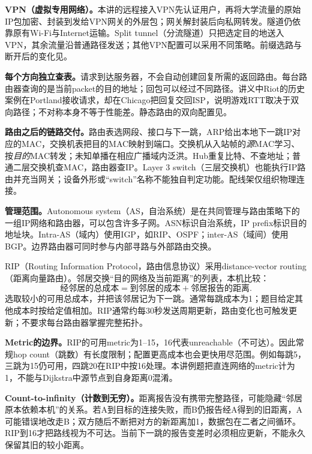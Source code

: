\textbf{VPN（虚拟专用网络）。}本讲的远程接入VPN先认证用户，再将大学流量的原始IP包加密、封装到发给VPN网关的外层包；网关解封装后向私网转发。隧道仍依靠原有Wi-Fi与Internet运输。Split tunnel（分流隧道）只把选定目的地送入VPN，其余流量沿普通路径发送；其他VPN配置可以采用不同策略。前缀选路与断开后的变化见。

\textbf{每个方向独立查表。}请求到达服务器，不会自动创建回复所需的返回路由。每台路由器查询的是当前packet的目的地址；回包可以经过不同路径。讲义中Riot的历史案例在Portland接收请求，却在Chicago把回复交回ISP，说明游戏RTT取决于双向路径；不对称本身不等于性能差。静态路由的双向配置见。

\textbf{路由之后的链路交付。}路由表选网段、接口与下一跳，ARP给出本地下一跳IP对应的MAC，交换机表把目的MAC映射到端口。交换机从入站帧的\emph{源}MAC学习、按\emph{目的}MAC转发；未知单播在相应广播域内泛洪。Hub重复比特、不查地址；普通二层交换机查MAC，路由器查IP。Layer 3 switch（三层交换机）也能执行IP路由并充当网关；设备外形或“switch”名称不能独自判定功能。配线架仅组织物理连接。

\textbf{管理范围。}Autonomous system（AS，自治系统）是在共同管理与路由策略下的一组IP网络和路由器，可以包含许多子网。ASN标识自治系统，IP prefix标识目的地址块。Intra-AS（域内）使用IGP，如RIP、OSPF；inter-AS（域间）使用BGP。边界路由器可同时参与内部寻路与外部路由交换。


RIP（Routing Information Protocol，路由信息协议）采用distance-vector routing（距离向量路由）。邻居交换“目的网络及当前距离”的列表，本机比较：
\[
 \boxed{\text{经邻居的总成本}
 =\text{到邻居的成本}+\text{邻居报告的距离}}.
\]
选取较小的可用总成本，并把该邻居记为下一跳。通常每跳成本为1；题目给定其他成本时按给定值相加。RIP通常约每30秒发送周期更新，路由变化也可触发更新；不要求每台路由器掌握完整拓扑。

\textbf{Metric的边界。}RIP的可用metric为1--15，16代表unreachable（不可达）。因此常规hop count（跳数）有长度限制；配置更高成本也会更快用尽范围。例如每跳5，三跳为15仍可用，四跳20在RIP中按16处理。本讲例题把直连网络的metric计为1，不能与Dijkstra中源节点到自身距离0混淆。

\textbf{Count-to-infinity（计数到无穷）。}距离报告没有携带完整路径，可能隐藏“邻居原本依赖本机”的关系。若A到目标的连接失败，而B仍报告经A得到的旧距离，A可能错误地改走B；双方随后不断把对方的新距离加1，数据包在二者之间循环。RIP到16才把路线视为不可达。当前下一跳的报告变差时必须相应更新，不能永久保留其旧的较小距离。

